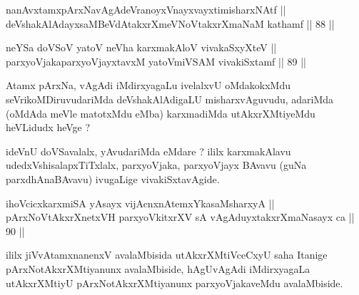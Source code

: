 
\begin{shl}
nanAvxtamxpArxNavAgAdeVranoyxVnayxvayxtimisharxNAtf || \\
deVshakAlAdayxsaMBeVdAtakxrXmeVNoVtakxrXmaNaM kathamf \hfill || 88 || 
\end{shl}

\begin{shl}
neYSa doVSoV yatoV neVha karxmakAloV vivakaSxyXteV || \\
parxyoVjakaparxyoVjayxtavxM yatoV\s miVSAM vivakiSxtamf \hfill || 89 ||  
\end{shl}

\begin{artha}
Atamx pArxNa, vAgAdi iMdirxyagaLu ivelalxvU oMdakokxMdu
seVrikoMDiruvudariMda deVshakAlAdigaLU misharxvAguvudu, adariMda
(oMdAda meVle matotxMdu eMba) karxmadiMda utAkxrXMtiyeMdu heVLidudx
heVge ?
\end{artha}

\begin{artha}
ideVnU doVSavalalx, yAvudariMda eMdare ? ililx karxmakAlavu
udedxVshisalapxTiTxlalx, parxyoVjaka, parxyoVjayx BAvavu (guNa
parxdhAnaBAvavu) ivugaLige vivakiSxtavAgide.
\end{artha}

\begin{shl}
ihoVcicxkarxmiSA yA\s sayx vijAcnxnAtemxYkasaMsharxyA || \\
\footnotemark[1]pArxNoVtAkxrXnetxVH parxyoVkitxrXV sA vAgAduyxtakxrXmaNasayx ca \hfill || 90 ||  
\end{shl}

\begin{artha}
ililx jiVvAtamxnanenxV avalaMbisida utAkxrXMtiVceCxyU saha Itanige
pArxNotAkxrXMtiyanunx avalaMbiside, hAgUvAgAdi iMdirxyagaLa
utAkxrXMtiyU pArxNotAkxrXMtiyanunx parxyoVjakaveMdu avalaMbiside.
\end{artha}

